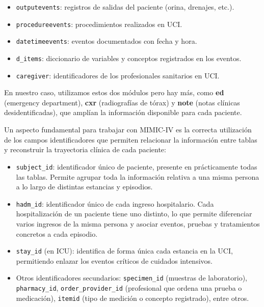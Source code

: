 \begin{itemize}
\begin{itemize}
        \item \texttt{outputevents}: registros de salidas del paciente (orina, drenajes, etc.).
        \item \texttt{procedureevents}: procedimientos realizados en UCI.
        \item \texttt{datetimeevents}: eventos documentados con fecha y hora.
        \item \texttt{d\_items}: diccionario de variables y conceptos registrados en los eventos.
        \item \texttt{caregiver}: identificadores de los profesionales sanitarios en UCI.
    \end{itemize}
\end{itemize}


En nuestro caso, utilizamos estos dos módulos pero hay más, como \textbf{ed} (emergency department), \textbf{cxr} (radiografías de tórax) y \textbf{note} (notas clínicas desidentificadas), que amplían la información disponible para cada paciente.

Un aspecto fundamental para trabajar con MIMIC-IV es la correcta utilización de los campos identificadores que permiten relacionar la información entre tablas y reconstruir la trayectoria clínica de cada paciente:

\begin{itemize}
    \item \texttt{subject\_id}: identificador único de paciente, presente en prácticamente todas las tablas. Permite agrupar toda la información relativa a una misma persona a lo largo de distintas estancias y episodios.
    \item \texttt{hadm\_id}: identificador único de cada ingreso hospitalario. Cada hospitalización de un paciente tiene uno distinto, lo que permite diferenciar varios ingresos de la misma persona y asociar eventos, pruebas y tratamientos concretos a cada episodio.
    \item \texttt{stay\_id} (en ICU): identifica de forma única cada estancia en la UCI, permitiendo enlazar los eventos críticos de cuidados intensivos.
    \item Otros identificadores secundarios: \texttt{specimen\_id} (muestras de laboratorio), \texttt{pharmacy\_id}, \texttt{order\_provider\_id} (profesional que ordena una prueba o medicación), \texttt{itemid} (tipo de medición o concepto registrado), entre otros.
\end{itemize}

